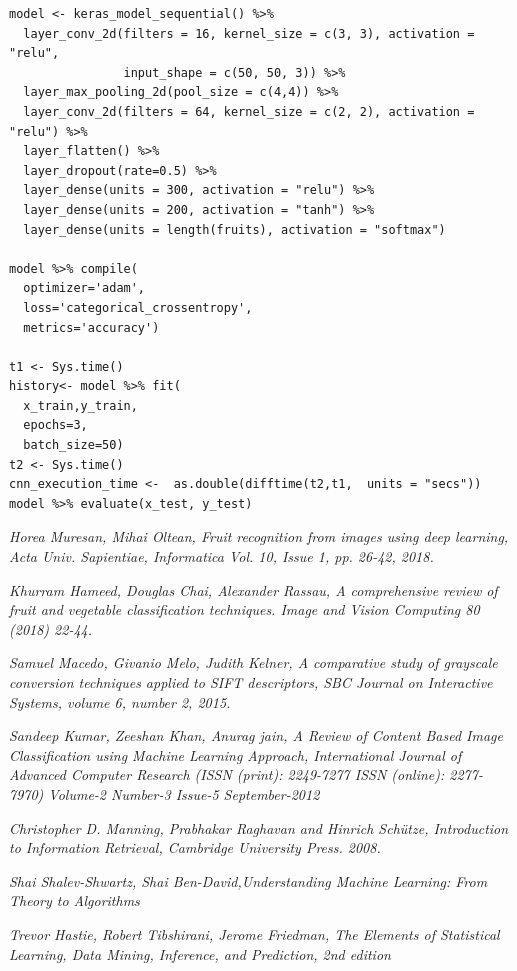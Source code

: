 \documentclass{article}
\begin{document}
\begin{verbatim}
model <- keras_model_sequential() %>%
  layer_conv_2d(filters = 16, kernel_size = c(3, 3), activation = "relu",
                input_shape = c(50, 50, 3)) %>%
  layer_max_pooling_2d(pool_size = c(4,4)) %>%
  layer_conv_2d(filters = 64, kernel_size = c(2, 2), activation = "relu") %>%
  layer_flatten() %>%
  layer_dropout(rate=0.5) %>%
  layer_dense(units = 300, activation = "relu") %>%
  layer_dense(units = 200, activation = "tanh") %>%
  layer_dense(units = length(fruits), activation = "softmax")

model %>% compile(
  optimizer='adam',
  loss='categorical_crossentropy',
  metrics='accuracy')

t1 <- Sys.time()
history<- model %>% fit(
  x_train,y_train,
  epochs=3,
  batch_size=50)
t2 <- Sys.time()
cnn_execution_time <-  as.double(difftime(t2,t1,  units = "secs"))
model %>% evaluate(x_test, y_test)

\end{verbatim}

\newpage
\begin{thebibliography}{9}

\textit{Horea Muresan, Mihai Oltean, Fruit recognition from images using deep learning, Acta Univ. Sapientiae, Informatica Vol. 10, Issue 1, pp. 26-42, 2018.}

\textit{Khurram Hameed, Douglas Chai, Alexander Rassau, A comprehensive review of fruit and vegetable classification techniques. Image and Vision Computing 80 (2018) 22-44.} 

\textit{Samuel Macedo, Givanio Melo, Judith Kelner, A comparative study of grayscale conversion techniques applied to SIFT descriptors, SBC Journal on Interactive Systems, volume 6, number 2, 2015.}

\textit{Sandeep Kumar, Zeeshan Khan, Anurag jain, A Review of Content Based Image Classification using Machine Learning Approach, International Journal of Advanced Computer Research (ISSN (print): 2249-7277 ISSN (online): 2277-7970) Volume-2 Number-3 Issue-5 September-2012}

\textit{Christopher D. Manning, Prabhakar Raghavan and Hinrich Schütze, Introduction to Information Retrieval, Cambridge University Press. 2008.}

\textit{Shai Shalev-Shwartz, Shai Ben-David,Understanding Machine Learning: From Theory to Algorithms}

\textit{Trevor Hastie, Robert Tibshirani, Jerome Friedman, The Elements of Statistical Learning, Data Mining, Inference, and Prediction, 2nd edition}

\end{thebibliography} 
\end{document}

